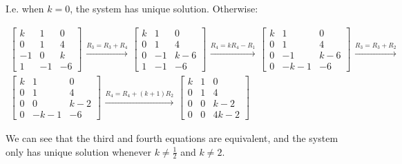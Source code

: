 \documentclass[11pt]{article}
\begin{document}
I.e. when \(k = 0\), the system has unique solution.  Otherwise:

\begin{align*}
  \begin{bmatrix}
    k  & 1  & 0 \\
    0  & 1  & 4 \\
    -1 & 0  & k \\
    1  & -1 & -6
  \end{bmatrix}
  \begin{aligned} \xrightarrow{R_3 = R_3 + R_4} \end{aligned}
  \begin{bmatrix}
    k & 1  & 0 \\
    0 & 1  & 4 \\
    0 & -1 & k-6 \\
    1 & -1 & -6
  \end{bmatrix}
  \begin{aligned} \xrightarrow{R_4 = kR_4 - R_1} \end{aligned}
  \begin{bmatrix}
    k & 1    & 0 \\
    0 & 1    & 4 \\
    0 & -1   & k-6 \\
    0 & -k-1 & -6
  \end{bmatrix}
  \begin{aligned} \xrightarrow{R_3 = R_3 + R_2} \end{aligned} \\
  \begin{bmatrix}
    k & 1    & 0 \\
    0 & 1    & 4 \\
    0 & 0    & k-2 \\
    0 & -k-1 & -6
  \end{bmatrix}
  \begin{aligned} \xrightarrow{R_4 = R_4 + (k+1)R_2} \end{aligned}
  \begin{bmatrix}
    k & 1 & 0 \\
    0 & 1 & 4 \\
    0 & 0 & k-2 \\
    0 & 0 & 4k-2 
  \end{bmatrix}
\end{align*}

We can see that the third and fourth equations are equivalent, and the system
only has unique solution whenever \(k \neq \frac{1}{2}\) and \(k \neq 2\).
\end{document}

